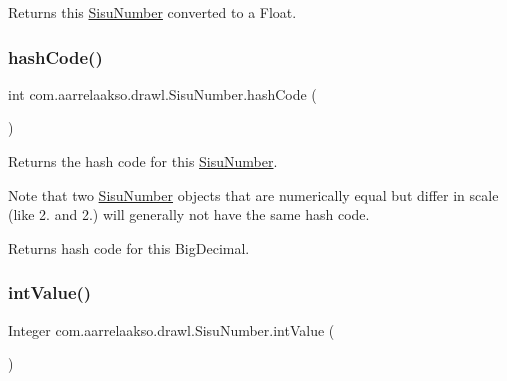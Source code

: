\begin{DoxyReturn}{Returns}
this \hyperlink{classcom_1_1aarrelaakso_1_1drawl_1_1_sisu_number}{Sisu\+Number} converted to a Float. 
\end{DoxyReturn}
\mbox{\label{classcom_1_1aarrelaakso_1_1drawl_1_1_sisu_number_a84f5852d7f79f865cc51d710d09b7032}} 
\subsubsection{\texorpdfstring{hash\+Code()}{hashCode()}}
{\footnotesize\ttfamily int com.\+aarrelaakso.\+drawl.\+Sisu\+Number.\+hash\+Code (\begin{DoxyParamCaption}{ }\end{DoxyParamCaption})}



Returns the hash code for this \hyperlink{classcom_1_1aarrelaakso_1_1drawl_1_1_sisu_number}{Sisu\+Number}. 

Note that two \hyperlink{classcom_1_1aarrelaakso_1_1drawl_1_1_sisu_number}{Sisu\+Number} objects that are numerically equal but differ in scale (like 2. and 2.) will generally not have the same hash code.

\begin{DoxyReturn}{Returns}
hash code for this Big\+Decimal. 
\end{DoxyReturn}
\mbox{\label{classcom_1_1aarrelaakso_1_1drawl_1_1_sisu_number_aa47667c48867cb223722df6facb0da42}} 
\subsubsection{\texorpdfstring{int\+Value()}{intValue()}}
{\footnotesize\ttfamily Integer com.\+aarrelaakso.\+drawl.\+Sisu\+Number.\+int\+Value (\begin{DoxyParamCaption}{ }\end{DoxyParamCaption})\hspace{0.3cm}{\ttfamily [protected]}}



